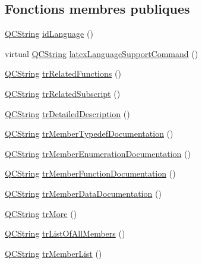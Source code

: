 \subsection*{Fonctions membres publiques}
\begin{DoxyCompactItemize}
\item 
\hyperlink{class_q_c_string}{Q\+C\+String} \hyperlink{class_translator_portuguese_abc1436faf18f09df7579a53e537fc56a}{id\+Language} ()
\item 
virtual \hyperlink{class_q_c_string}{Q\+C\+String} \hyperlink{class_translator_portuguese_a1396ca92359aa49347ab1ac381acebb3}{latex\+Language\+Support\+Command} ()
\item 
\hyperlink{class_q_c_string}{Q\+C\+String} \hyperlink{class_translator_portuguese_aa602d4780f162f3f07d20f7e4cbeea5f}{tr\+Related\+Functions} ()
\item 
\hyperlink{class_q_c_string}{Q\+C\+String} \hyperlink{class_translator_portuguese_a6aea8d18283e8182a67726fccd68b744}{tr\+Related\+Subscript} ()
\item 
\hyperlink{class_q_c_string}{Q\+C\+String} \hyperlink{class_translator_portuguese_a2dae00e057abe35b7803d9e7c48e8c5c}{tr\+Detailed\+Description} ()
\item 
\hyperlink{class_q_c_string}{Q\+C\+String} \hyperlink{class_translator_portuguese_a1ef77336f6841771f0782fd7de33c391}{tr\+Member\+Typedef\+Documentation} ()
\item 
\hyperlink{class_q_c_string}{Q\+C\+String} \hyperlink{class_translator_portuguese_aed1576e1ad9622e1a79e0d9250b9039e}{tr\+Member\+Enumeration\+Documentation} ()
\item 
\hyperlink{class_q_c_string}{Q\+C\+String} \hyperlink{class_translator_portuguese_a763aeb9393a316c2ef69b13d969e59f1}{tr\+Member\+Function\+Documentation} ()
\item 
\hyperlink{class_q_c_string}{Q\+C\+String} \hyperlink{class_translator_portuguese_a0d6b063892d35726748f79e8a669e7d6}{tr\+Member\+Data\+Documentation} ()
\item 
\hyperlink{class_q_c_string}{Q\+C\+String} \hyperlink{class_translator_portuguese_ac5f0e7715631eb9c7b02d7c2114c4a37}{tr\+More} ()
\item 
\hyperlink{class_q_c_string}{Q\+C\+String} \hyperlink{class_translator_portuguese_ab515ef96060b58670c6366af6a43a8f4}{tr\+List\+Of\+All\+Members} ()
\item 
\hyperlink{class_q_c_string}{Q\+C\+String} \hyperlink{class_translator_portuguese_a9e312975f07b5366f88c047566803667}{tr\+Member\+List} ()

\end{DoxyCompactItemize}
